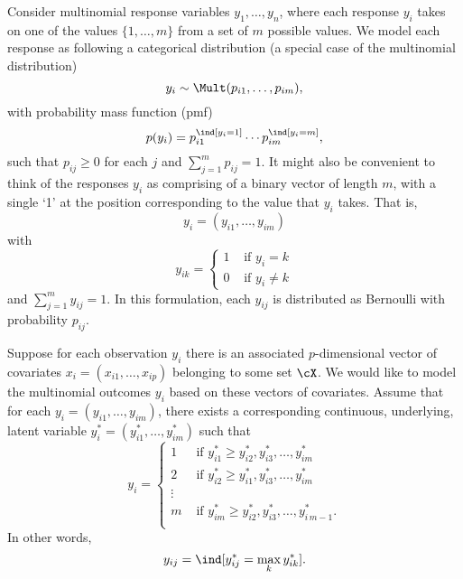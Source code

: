 Consider multinomial response variables $y_1, \dots, y_n$, where each response $y_i$ takes on one of the values $\{1,\dots,m\}$ from a set of $m$ possible values. We model each response as following a categorical distribution (a special case of the multinomial distribution)
\[
  y_i \sim \Mult(p_{i1}, \dots, p_{im}),
\]
with probability mass function (pmf)
\[
  p(y_i) = p_{i1}^{\ind[y_i = 1]} \cdots p_{im}^{\ind[y_i = m]},
\]
such that $p_{ij} \geq 0 $ for each $j$ and $\sum_{j=1}^m p_{ij} = 1$. It might also be convenient to think of the responses $y_i$ as comprising of a binary vector of length $m$, with a single `1' at the position corresponding to the value that $y_i$ takes. That is,
\[
  y_i = (y_{i1}, \dots, y_{im})
\]
with
\[
  y_{ik} =
  \begin{cases}
    1 &\text{ if } y_i = k \\
    0 &\text{ if } y_i \neq k
  \end{cases}
\]
and $\sum_{j=1}^m y_{ij} = 1$. In this formulation, each $y_{ij}$ is distributed as Bernoulli with probability $p_{ij}$.

Suppose for each observation $y_i$ there is an associated $p$-dimensional vector of covariates $x_i = (x_{i1}, \dots, x_{ip})$ belonging to some set $\cX$. We would like to model the multinomial outcomes $y_i$ based on these vectors of covariates. Assume that for each $y_i = (y_{i1}, \dots, y_{im})$, there exists a corresponding continuous, underlying, latent variable $y_i^* = (y_{i1}^*, \dots, y_{im}^*)$ such that
\[
  y_i =
  \begin{cases}
    1 &\text{ if } y_{i1}^* \geq y_{i2}^*, y_{i3}^*, \dots, y_{im}^* \\
    2 &\text{ if } y_{i2}^* \geq y_{i1}^*, y_{i3}^*, \dots, y_{im}^* \\
    \vdots \\
    m &\text{ if } y_{im}^* \geq y_{i2}^*, y_{i3}^*, \dots, y_{i\,m-1}^*. \\
  \end{cases}
\]
In other words, 
\[
  y_{ij} = \ind[y_{ij}^* = \max_k y_{ik}^*].
\]

